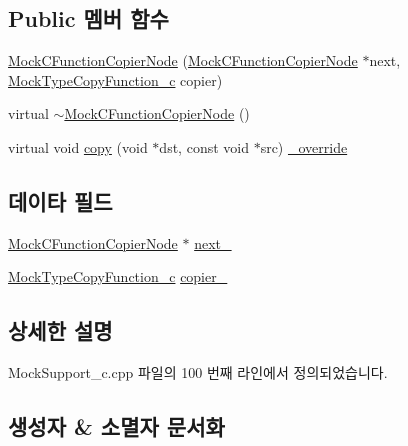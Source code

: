 \subsection*{Public 멤버 함수}
\begin{DoxyCompactItemize}
\item 
\hyperlink{class_mock_c_function_copier_node_a86adb0185ac12cb5bea907dfbdb31cd8}{Mock\+C\+Function\+Copier\+Node} (\hyperlink{class_mock_c_function_copier_node}{Mock\+C\+Function\+Copier\+Node} $\ast$next, \hyperlink{_mock_support__c_8h_a8afeb5ff4785933c6defdeefa3453e2d}{Mock\+Type\+Copy\+Function\+\_\+c} copier)
\item 
virtual \hyperlink{class_mock_c_function_copier_node_a0799142f4dd530800061cfec42676c87}{$\sim$\+Mock\+C\+Function\+Copier\+Node} ()
\item 
virtual void \hyperlink{class_mock_c_function_copier_node_aeba9b4dda05de7261bbf65c7af360c02}{copy} (void $\ast$dst, const void $\ast$src) \hyperlink{_cpp_u_test_config_8h_a049bea15dd750e15869863c94c1efc3b}{\+\_\+override}
\end{DoxyCompactItemize}
\subsection*{데이타 필드}
\begin{DoxyCompactItemize}
\item 
\hyperlink{class_mock_c_function_copier_node}{Mock\+C\+Function\+Copier\+Node} $\ast$ \hyperlink{class_mock_c_function_copier_node_a783ed8acf7f9f8f2ddc70b42d0065f11}{next\+\_\+}
\item 
\hyperlink{_mock_support__c_8h_a8afeb5ff4785933c6defdeefa3453e2d}{Mock\+Type\+Copy\+Function\+\_\+c} \hyperlink{class_mock_c_function_copier_node_a875f62659fb42a0fd23e9679f58db34f}{copier\+\_\+}
\end{DoxyCompactItemize}


\subsection{상세한 설명}


Mock\+Support\+\_\+c.\+cpp 파일의 100 번째 라인에서 정의되었습니다.



\subsection{생성자 \& 소멸자 문서화}
